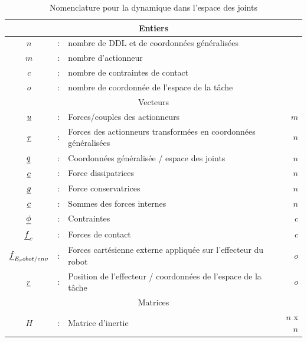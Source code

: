 \begin{table}[htbp]
	\centering
	\caption{Nomenclature pour la dynamique dans l'espace des joints}	%
		\begin{tabular}{ c c l r }
        \hline \hline
				\multicolumn{4}{c}{Entiers} \\
				\hline \hline
			$n$             &  :  & nombre de DDL et de coordonnées généralisées                                         & \\
			$m$             &  :  & nombre d'actionneur                                       & \\
			$c$             &  :  & nombre de contraintes de contact                             & \\
			$o$             &  :  & nombre de coordonnée de l'espace de la tâche                        & \\ 
			\hline \hline
			\multicolumn{4}{c}{Vecteurs} \\
			\hline \hline
			$\underline{u}$    &  :  & Forces/couples des actionneurs                                   & $m$  \\
            $\underline{\tau}$    &  :  & Forces des actionneurs transformées en coordonnées généralisées                              & $n$  \\
			$\underline{q}$       &  :  & Coordonnées généralisée / espace des joints    & $n$  \\
			$\underline{c}$       &  :  & Force dissipatrices                             & $n$  \\
			$\underline{g}$       &  :  & Force conservatrices                              & $n$  \\
			$\underline{c}$       &  :  & Sommes des forces internes                 & $n$  \\
			$\underline{\phi}$    &  :  & Contraintes                                          & $c$  \\
			$\underline{f}_c$     &  :  & Forces de contact                                     & $c$  \\
			$\underline{f}_{E_robot/env}$     &  :  & Forces cartésienne externe appliquée sur l'effecteur du robot                  & $o$  \\
			$\underline{r}$       &  :  & Position de l'effecteur / coordonnées de l'espace de la tâche                             & $o$  \\
			\hline \hline
			\multicolumn{4}{c}{Matrices} \\
			\hline \hline
			$H$             &  :  & Matrice d'inertie                                            & $n$ x $n$ \\

\end{tabular}
\end{table}
